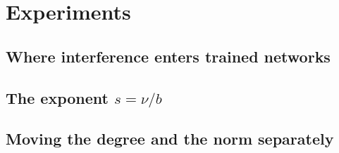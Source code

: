 \section{Experiments}\label{sec:experiments}

\subsection{Where interference enters trained networks}

\subsection{The exponent \texorpdfstring{$s=\nu/b$}{s = nu/b}}

\subsection{Moving the degree and the norm separately}
